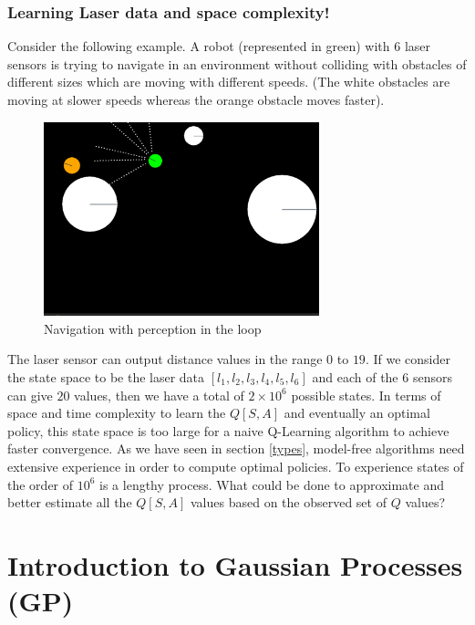 \documentclass[12pt]{report}
\begin{document}
\subsubsection{Learning Laser data and space complexity!}
Consider the following example. A robot (represented in green) with $6$ laser sensors is trying to navigate in an environment without colliding with obstacles of different sizes which are moving with different speeds. (The white obstacles are moving at slower speeds whereas the orange obstacle moves faster).
\begin{figure}[htp]
	\centering
	\includegraphics[width=8cm]{gp_laser.pdf}
	\caption{Navigation with perception in the loop}
   \label{fig:gp_laser}
\end{figure}
The laser sensor can output distance values in the range $0$ to $19$. If we consider the state space to be the laser data $[l_1,l_2,l_3,l_4,l_5,l_6]$ and each of the $6$ sensors can give $20$ values, then we have a total of $2 \times 10^6$ possible states. In terms of space and time complexity to learn the $Q[S,A]$ and eventually an optimal policy, this state space is too large for a naive Q-Learning algorithm to achieve faster convergence. As we have seen in section \ref{types}, model-free algorithms need extensive experience in order to compute optimal policies. To experience states of the order of $10^6$ is a lengthy process. What could be done to approximate and better estimate all the $Q[S,A]$ values based on the observed set of $Q$ values?

\section{Introduction to Gaussian Processes (GP)} %
\label{introToGPs} %
\end{document}
